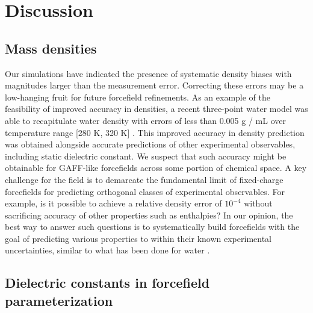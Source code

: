\documentclass[aps,pre,twocolumn,nofootinbib,superscriptaddress,linenumbers]{revtex4-1}
\begin{document}

\section{Discussion}

\subsection{Mass densities}

Our simulations have indicated the presence of systematic density biases with magnitudes larger than the measurement error.  
Correcting these errors may be a low-hanging fruit for future forcefield refinements.
As an example of the feasibility of improved accuracy in densities, a recent three-point water model was able to recapitulate water density with errors of less than 0.005 g / mL over temperature range [280 K, 320 K] \cite{wang2014building}.
This improved accuracy in density prediction was obtained alongside accurate predictions of other experimental observables, including static dielectric constant.  
We suspect that such accuracy might be obtainable for GAFF-like forcefields across some portion of chemical space.  
A key challenge for the field is to demarcate the fundamental limit of fixed-charge forcefields for predicting orthogonal classes of experimental observables.
For example, is it possible to achieve a relative density error of $10^{-4}$ without sacrificing accuracy of other properties such as enthalpies?
In our opinion, the best way to answer such questions is to systematically build forcefields with the goal of predicting various properties to within their known experimental uncertainties, similar to what has been done for water \cite{horn2004, wang2014building}.



\subsection{Dielectric constants in forcefield parameterization}
\end{document}
